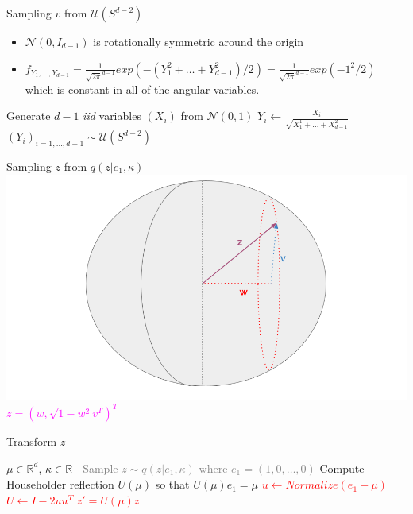 \begin{frame}{Sampling $v$ from $\mathcal{U}(S^{d-2})$}
  \begin{itemize}
    \item $\mathcal{N}(0, I_{d-1})$ is rotationally symmetric around the origin
    \item $f_{Y_1, \dots, Y_{d-1}} = \frac{1}{\sqrt{2\pi}^{d-1}} exp(- (Y_1^2 + \dots + Y_{d-1}^2)/2) = \frac{1}{\sqrt{2\pi}^{d-1}}exp(-1^2/2) $ which is constant in all of the angular variables.
  \end{itemize}
  \vfill
  \begin{algorithm}[H]
    \caption{Sampling $v$ from $\mathcal{U}(S^{d-2})$}
  \begin{algorithmic}[1]
    \STATE Generate $d-1$ \textit{iid} variables $(X_i)$ from $\mathcal{N}(0, 1)$
    \STATE $Y_i \gets \frac{X_i}{\sqrt{X_1^1 + \dots + X_{d-1}^2}}$
    \RETURN $(Y_i)_{i=1, \dots, d-1} \sim \mathcal{U}(S^{d-2})$  
  \end{algorithmic}
  \end{algorithm}
\end{frame}

\begin{frame}{Sampling $z$ from $q(z|e_1, \kappa)$}
  \centering
  \includegraphics[width=\textwidth]{figures/illustration_sampling_4.png}
  \textcolor{magenta}{$z = (w, \sqrt{1 - w^2}v^T)^T$}
\end{frame}

\begin{frame}{Transform $z$}
  \begin{algorithm}[H]
    \caption{Overview of the sampling method from $vMF(\mu, \kappa)$}\label{alg:overviewsampling3}
    \begin{algorithmic}[1]
      \REQUIRE $\mu \in \mathbb{R}^d$, $\kappa \in \mathbb{R}_+$
      \textcolor{gray}{ \STATE Sample $z \sim q(z| e_1, \kappa)$ where $e_1 = (1, 0, \dots, 0)$ }
      \STATE Compute Householder reflection $U(\mu)$ so that $U(\mu) e_1 = \mu$
      \textcolor{red}{
      \STATE $u \gets Normalize(e_1 - \mu)$ 
      \STATE $U \gets I - 2uu^T$}
     \textcolor{red}{\RETURN $z' = U(\mu) z$}
    \end{algorithmic}
    \end{algorithm}
\end{frame}

